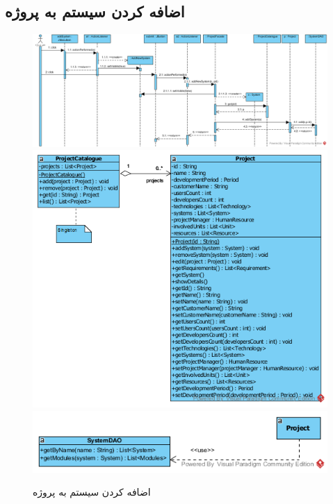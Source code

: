 \begin{landscape}
\section{اضافه کردن سیستم به پروژه}
\begin{figure}[H]
	\centering
	\includegraphics[scale=0.55]{img/sequence-design/AddSystemToProject}
	\includegraphics[scale=0.6]{img/sequence-design/AddSystemToProjectC}
	\includegraphics[scale=0.6]{img/sequence-design/AddSystemToProjectD}
	\caption{اضافه کردن سیستم به پروژه}
\end{figure}
\end{landscape}

